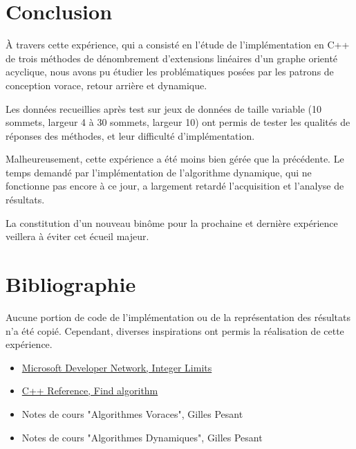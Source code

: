 \documentclass[10pt,a4paper]{article}
\begin{document}
\section{Conclusion}

À travers cette expérience, qui a consisté en l'étude de l’implémentation en C++ de trois méthodes de dénombrement d'extensions linéaires d'un graphe orienté acyclique, nous avons pu étudier les problématiques posées par les patrons de conception vorace, retour arrière et dynamique.

Les données recueillies après test sur jeux de données de taille variable (10 sommets, largeur 4 à 30 sommets, largeur 10) ont permis de tester les qualités de réponses des méthodes, et leur difficulté d'implémentation.

Malheureusement, cette expérience a été moins bien gérée que la précédente. Le temps demandé par l'implémentation de l'algorithme dynamique, qui ne fonctionne pas encore à ce jour, a largement retardé l'acquisition et l'analyse de résultats.

La constitution d'un nouveau binôme pour la prochaine et dernière expérience veillera à éviter cet écueil majeur.

\section{Bibliographie}

Aucune portion de code de l'implémentation ou de la représentation des résultats n'a été copié. Cependant, diverses inspirations ont permis la réalisation de cette expérience.

\begin{itemize}
	\item \href{http://msdn.microsoft.com/en-us/library/296az74e.aspx}{Microsoft Developer Network, Integer Limits}
	\item \href{http://www.cplusplus.com/reference/algorithm/find/}{C++ Reference, Find algorithm}
	\item Notes de cours "Algorithmes Voraces", Gilles Pesant
	\item Notes de cours "Algorithmes Dynamiques", Gilles Pesant
\end{itemize}
\end{document}
